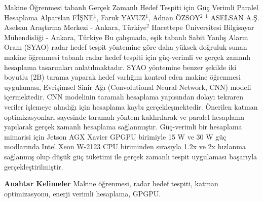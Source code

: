 
    \begin{abstract_online}{Makine Öğrenmesi tabanlı Gerçek Zamanlı Hedef Tespiti için Güç Verimli Paralel Hesaplama}{%
        Alparslan FİŞNE$^{1}$, Faruk YAVUZ$^{1}$, Adnan ÖZSOY$^{2}$}{%
        }{%
        $^1$ ASELSAN A.Ş. Aselsan Araştırma Merkezi - Ankara, Türkiye\newline{}$^2$ Hacettepe Üniversitesi Bilgisayar Mühendisliği - Ankara, Türkiye}
    Bu çalışmada, eşik tabanlı Sabit Yanlış Alarm Oranı (SYAO) radar hedef tespit yöntemine göre daha yüksek doğruluk sunan makine öğrenmesi tabanlı radar hedef tespiti için güç-verimli ve gerçek zamanlı hesaplama tasarımları anlatılmaktadır. SYAO yöntemine benzer şekilde iki boyutlu (2B) tarama yaparak hedef varlığını kontrol eden makine öğrenmesi uygulaması, Evrişimsel Sinir Ağı (Convolutional Neural Network, CNN) modeli içermektedir. CNN modelinin taramalı hesaplama yapısından dolayı tekraren veriler işlemeye alındığı için hesaplama kaybı gerçekleşmektedir. Önerilen katman optimizasyonları sayesinde taramalı yöntem kaldırılarak ve paralel hesaplama yapılarak gerçek zamanlı hesaplama sağlanmıştır. Güç-verimli bir hesaplama mimarisi için Jetson AGX Xavier GPGPU birimiyle 15 W ve 30 W güç modlarında Intel Xeon W-2123 CPU biriminden sırasıyla 1.2x ve 2x hızlanma sağlanmış olup düşük güç tüketimi ile gerçek zamanlı tespit uygulaması başarıyla gerçekleştirilmiştir. 
    
            \textbf{Anahtar Kelimeler} \newline{}Makine öğrenmesi, radar hedef tespiti, katman optimizasyonu, enerji verimli hesaplama, GPGPU.
    \end{abstract_online}
    
